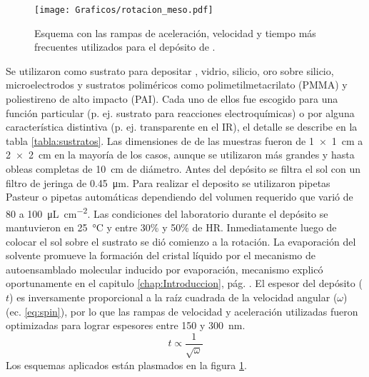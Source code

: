 						  \begin{figure}[!ht]
						  \begin{center}
						  \texttt{[image: Graficos/rotacion\_meso.pdf]}
						  \caption[Parámetros de depósito para las \pdm]{Esquema con las rampas de aceleración, velocidad y tiempo más frecuentes utilizados para el depósito de \pdm.}
						  \label{fig:rampa-spin}
						  \end{center}
						  \end{figure}
			Se utilizaron como sustrato para depositar \pdm , vidrio, silicio, oro sobre silicio, microelectrodos y sustratos poliméricos como  polimetilmetacrilato (PMMA) y poliestireno de alto impacto (PAI). Cada uno de ellos fue escogido para una función particular (p. ej. sustrato para reacciones electroquímicas) o por alguna característica distintiva (p. ej. transparente en el IR), el detalle se describe en la tabla \ref{tabla:sustratos}.
			Las dimensiones de de las muestras fueron de \SI{1x1}{\cm} a \SI{2x2}{\cm} en la mayoría de los casos, aunque se utilizaron más grandes y hasta obleas completas de \SI{10}{\cm} de diámetro. Antes del depósito se filtra el sol con un filtro de jeringa de \SI{0.45}{\um}. Para realizar el deposito se utilizaron pipetas Pasteur o pipetas automáticas dependiendo del volumen requerido que varió de 80 a \SI{100}{\uL.\cm^{-2}}. Las condiciones del laboratorio durante el depósito se mantuvieron en \SI{25}{\celsius} y entre 30\% y 50\% de HR.					  
			Inmediatamente luego de colocar el sol sobre el sustrato se dió comienzo a la rotación. La evaporación del solvente promueve la formación del cristal líquido por el mecanismo de autoensamblado molecular inducido por evaporación, mecanismo explicó oportunamente en el capitulo \ref{chap:Introduccion}, pág. \pageref{sec:mesoporosos}. El espesor del depósito ($t$) es inversamente proporcional a la raíz cuadrada de la velocidad angular ($\omega$)\cite{Meyerhofer1978,Hall1998} (ec. \ref{eq:spin}), por lo que las rampas de velocidad y aceleración utilizadas fueron optimizadas para lograr espesores entre 150 y \SI{300}{\nm}\cite{Nano-compuestas2013}. 
					\begin{equation}
			 		    t\propto \frac{1}{\sqrt{\omega}}
			 		     \label{eq:spin}
						\end{equation}
			Los esquemas aplicados están plasmados en la figura \ref{fig:rampa-spin}.
